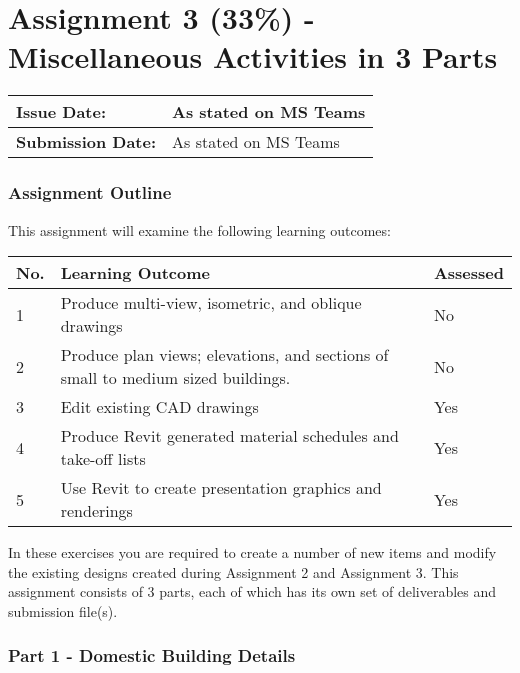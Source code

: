 
	

\part*{Assignment 3 (33\%) - Miscellaneous Activities in 3 Parts}



\begin{tabularx}{\textwidth}{ |X|X| }
	\hline
	\textbf{Issue Date:} & As stated on MS Teams \\
	\hline 
	\textbf{Submission Date:}  & As stated on MS Teams  \\
	\hline
\end{tabularx}



\section*{Assignment Outline}

This assignment will examine the following learning outcomes:

\begin{tabularx}{\textwidth}{ |X|X|X| }
	\hline
	\textbf{No.} & \textbf{Learning Outcome} & \textbf{Assessed} \\
	\hline 
	1  & Produce multi-view, isometric, and oblique drawings & No \\
	2  & Produce plan views; elevations, and sections of small to medium sized buildings. & No \\
	3  & Edit existing CAD drawings & Yes \\
	4  & Produce Revit generated material schedules and take-off lists & Yes \\
	5  & Use Revit to create presentation graphics and renderings & Yes \\
	\hline
\end{tabularx}

In these exercises you are required to create a number of new items and modify the existing designs created during Assignment 2 and Assignment 3.  This assignment consists of 3 parts, each of which has its own set of deliverables and submission file(s).

\newpage
\section*{Part 1 - Domestic Building Details}



